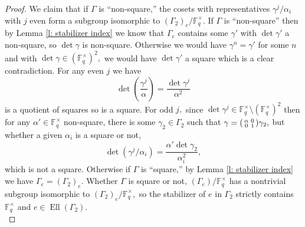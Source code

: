 \documentclass[11pt]{amsart}
\theoremstyle{definition}
\newenvironment{psmallmatrix}
{\left(\begin{smallmatrix}}
	{\end{smallmatrix}\right)}
\numberwithin{equation}{section}
\newcommand{\bbF}{\mathbb{F}}		%
\begin{document}
\begin{proof}
			We claim that if $\Gamma$ is ``non-square,'' the cosets with representatives $\gamma^j/\alpha_i$ with $j$ even form a subgroup isomorphic to $(\Gamma_2)_e/\bbF_q^{\times}.$ 
			If $\Gamma$ is ``non-square'' then by Lemma \ref{l: stabilizer index} we know that $\Gamma_e$ contains some $\gamma'$ with $\det\gamma'$ a non-square, so $\det\gamma$ is non-square. Otherwise we would have $\gamma^n=\gamma'$ for some $n$ and with $\det\gamma\in (\bbF_q^{\times})^2,$ we would have $\det\gamma'$ a square which is a clear contradiction.
			For any even $j$ we have
			\[\det\left(\frac{\gamma^j}{\alpha}\right)=\frac{\det\gamma^j}{\alpha^2}\] is a quotient of squares so is a square. For odd $j,$ since $\det\gamma^j\in \bbF_q^{\times}\setminus(\bbF_q^{\times})^2$ then for any $\alpha'\in \bbF_q^{\times}$ non-square, there is some $\gamma_2\in \Gamma_2$ such that $\displaystyle{\gamma=\begin{psmallmatrix}\alpha&0\\0&1\end{psmallmatrix}\gamma_2},$ but whether a given $\alpha_i$ is a square or not, 
			\[\det(\gamma^j/\alpha_i)=\frac{\alpha'\det\gamma_2}{\alpha_i^2},\] which is not a square. Otherwise if $\Gamma$ is ``square,'' by Lemma \ref{l: stabilizer index} we have $\Gamma_e=(\Gamma_2)_e.$  
			Whether $\Gamma$ is square or not, $(\Gamma_e)/\bbF_q^{\times}$ has a nontrivial subgroup isomorphic to $(\Gamma_2)_e/\bbF_q^{\times},$ so the stabilizer of $e$ in $\Gamma_2$ strictly contains $\bbF_q^{\times}$ and $e\in \operatorname{Ell}(\Gamma_2).$\\
			

\end{proof}
\end{document}
